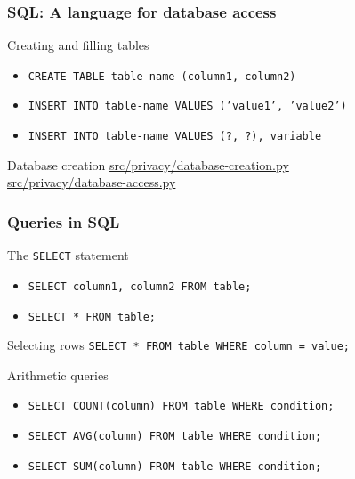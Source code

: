 \begin{frame}
  \frametitle{SQL: A language for database access}
  \begin{block}{Creating and filling tables}
    \begin{itemize}
    \item \texttt{CREATE TABLE table-name (column1, column2)}
    \item \texttt{INSERT INTO table-name VALUES ('value1', 'value2')}
    \item \texttt{INSERT INTO table-name VALUES (?, ?), variable}
    \end{itemize}
  \end{block}

  \begin{example}{Database creation}
    \url{src/privacy/database-creation.py}
    \\
    \url{src/privacy/database-access.py}
  \end{example}
\end{frame}
\begin{frame}
  \frametitle{Queries in SQL}
  \begin{block}{The \texttt{SELECT} statement}
    \begin{itemize}
    \item \texttt{SELECT column1, column2 FROM table;}
    \item \texttt{SELECT * FROM table;}
    \end{itemize}
  \end{block}

  \begin{block}{Selecting rows}
    \texttt{SELECT * FROM table WHERE column = value;}
  \end{block}

  \begin{exampleblock}{Arithmetic queries}
    \begin{itemize}
    \item  \texttt{SELECT COUNT(column) FROM table WHERE condition;}
    \item  \texttt{SELECT AVG(column) FROM table WHERE condition;}
    \item  \texttt{SELECT SUM(column) FROM table WHERE condition;}
    \end{itemize}
  \end{exampleblock}

\end{frame}

